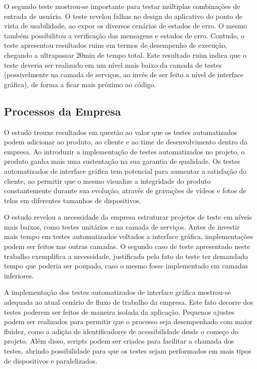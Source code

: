 O segundo teste mostrou-se importante para testar múltiplas combinações de entrada de usuário. O teste revelou falhas no design do aplicativo do ponto de vista de usabilidade, ao expor os diversos cenários de estados de erro. O mesmo também possibilitou a verificação das mensagens e estados de erro. Contudo, o teste apresentou resultados ruins em termos de desempenho de execução, chegando a ultrapassar $20$min de tempo total. Este resultado ruim indica que o teste deveria ser realizado em um nível mais baixo da camada de testes (possivelmente na camada de serviços, ao invés de ser feito a nível de interface gráfica), de forma a ficar mais próximo ao código.

\subsection{Processos da Empresa}
O estudo trouxe resultados em questão ao valor que os testes automatizados podem adicionar ao produto, ao cliente e ao time de desenvolvimento dentro da empresa. Ao introduzir a implementação de testes automatizados no projeto, o produto ganha mais uma sustentação na sua garantia de qualidade. Os testes automatizados de interface gráfica tem potencial para aumentar a satisfação do cliente, ao permitir que o mesmo visualize a integridade do produto constantemente durante sua evolução, através de gravações de vídeos e fotos de telas em diferentes tamanhos de dispositivos.

O estudo revelou a necessidade da empresa estruturar projetos de teste em níveis mais baixos, como testes unitários e na camada de serviços. Antes de investir mais tempo em testes automatizados voltados a interface gráfica, implementações podem ser feitos nas outras camadas. O segundo caso de teste apresentado neste trabalho exemplifica a necessidade, justificada pelo fato do teste ter demandado tempo que poderia ser poupado, caso o mesmo fosse implementado em camadas inferiores.

A implementação dos testes automatizados de interface gráfica mostrou-se adequada ao atual cenário de fluxo de trabalho da empresa. Este fato decorre dos testes poderem ser feitos de maneira isolada da aplicação. Pequenos ajustes podem ser realizados para permitir que o processo seja desempenhado com maior fluidez, como a adição de identificadores de acessibilidade desde o começo do projeto. Além disso, scripts podem ser criados para facilitar a chamada dos testes, abrindo possibilidade para que os testes sejam performados em mais tipos de dispositivos e paralelizados.

